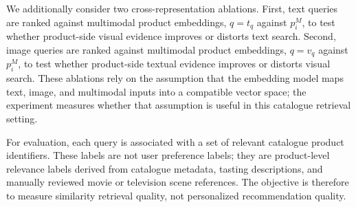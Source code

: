 We additionally consider two cross-representation ablations. First, text queries are ranked against multimodal product embeddings, $q=t_q$ against $p_i^{M}$, to test whether product-side visual evidence improves or distorts text search. Second, image queries are ranked against multimodal product embeddings, $q=v_q$ against $p_i^{M}$, to test whether product-side textual evidence improves or distorts visual search. These ablations rely on the assumption that the embedding model maps text, image, and multimodal inputs into a compatible vector space; the experiment measures whether that assumption is useful in this catalogue retrieval setting.

For evaluation, each query is associated with a set of relevant catalogue product identifiers. These labels are not user preference labels; they are product-level relevance labels derived from catalogue metadata, tasting descriptions, and manually reviewed movie or television scene references. The objective is therefore to measure similarity retrieval quality, not personalized recommendation quality.
